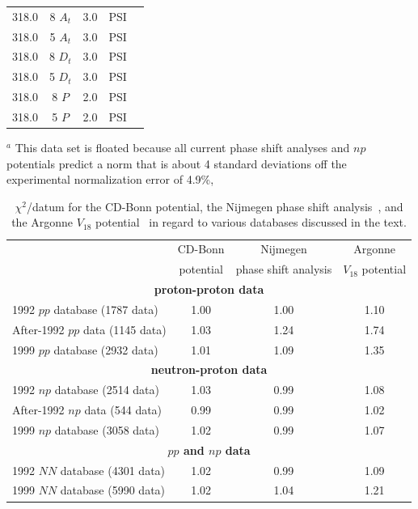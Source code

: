 \begin{table}
\begin{tabular}{ccccr}
318.0     & 8 $A_t$ & 3.0 & PSI & \cite{Ah98} \\
318.0     & 5 $A_t$ & 3.0 & PSI & \cite{Ah98} \\
318.0     & 8 $D_t$ & 3.0 & PSI & \cite{Ah98} \\
318.0     & 5 $D_t$ & 3.0 & PSI & \cite{Ah98} \\
318.0     & 8 $P  $ & 2.0 & PSI & \cite{Ah98} \\
318.0     & 5 $P  $ & 2.0 & PSI & \cite{Ah98} \\
\end{tabular}
$^a$ This data set is floated because all current phase shift analyses and
$np$ potentials predict a norm that is about 4 standard deviations off
the experimental normalization error of 4.9\%, 
\label{tab_npdat}
\end{table}


\pagebreak


\begin{table}
\caption{$\chi^2$/datum for the CD-Bonn potential, the Nijmegen phase
shift analysis~\protect\cite{Sto93}, 
and the Argonne $V_{18}$ potential~\protect\cite{WSS95}
in regard to various databases discussed in the text.}
\begin{tabular}{lccc}
                   
 & CD-Bonn 
 & Nijmegen 
 & Argonne 
\\

 & potential
 & phase shift analysis
 & $V_{18}$ potential
\\
\hline 
\hline 
\multicolumn{4}{c}{\bf proton-proton data} \\
1992 $pp$ database (1787 data) & 1.00 & 1.00 & 1.10 \\
After-1992 $pp$ data (1145 data) & 1.03 & 1.24 & 1.74 \\
1999 $pp$ database (2932 data) & 1.01 & 1.09 & 1.35 \\
\hline 
\multicolumn{4}{c}{\bf neutron-proton data} \\
1992 $np$ database (2514 data) & 1.03 & 0.99 & 1.08 \\
After-1992 $np$ data (544 data) & 0.99 & 0.99 & 1.02 \\
1999 $np$ database (3058 data) & 1.02 & 0.99 & 1.07 \\
\hline 
\multicolumn{4}{c}{\bf {\boldmath $pp$} and {\boldmath $np$} data} \\
1992 $NN$ database (4301 data) & 1.02 & 0.99 & 1.09 \\
1999 $NN$ database (5990 data) & 1.02 & 1.04 & 1.21 \\
\end{tabular}
\label{tab_chi2}
\end{table}


